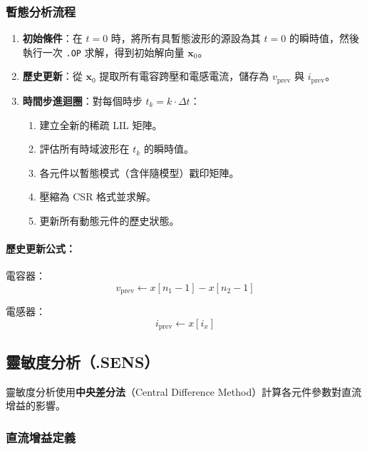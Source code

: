 \documentclass[12pt,a4paper]{article}
\begin{document}
\subsubsection{暫態分析流程}

\begin{enumerate}
  \item \textbf{初始條件}：在 $t = 0$ 時，將所有具暫態波形的源設為其 $t=0$ 的瞬時值，然後執行一次 \texttt{.OP} 求解，得到初始解向量 $\mathbf{x}_0$。
  \item \textbf{歷史更新}：從 $\mathbf{x}_0$ 提取所有電容跨壓和電感電流，儲存為 $v_{\text{prev}}$ 與 $i_{\text{prev}}$。
  \item \textbf{時間步進迴圈}：對每個時步 $t_k = k \cdot \Delta t$：
    \begin{enumerate}[label=(\alph*)]
      \item 建立全新的稀疏 LIL 矩陣。
      \item 評估所有時域波形在 $t_k$ 的瞬時值。
      \item 各元件以暫態模式（含伴隨模型）戳印矩陣。
      \item 壓縮為 CSR 格式並求解。
      \item 更新所有動態元件的歷史狀態。
    \end{enumerate}
\end{enumerate}

\paragraph{歷史更新公式：}

電容器：
\begin{equation}
v_{\text{prev}} \leftarrow x[n_1 - 1] - x[n_2 - 1]
\end{equation}

電感器：
\begin{equation}
i_{\text{prev}} \leftarrow x[i_x]
\end{equation}

\subsection{靈敏度分析（.SENS）}

靈敏度分析使用\textbf{中央差分法}（Central Difference Method）計算各元件參數對直流增益的影響。

\subsubsection{直流增益定義}
\end{document}
